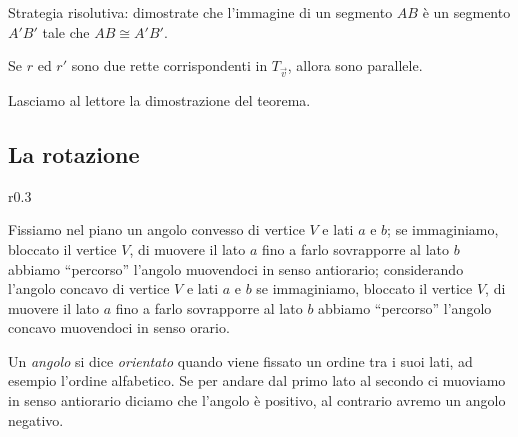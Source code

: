 Strategia risolutiva: dimostrate che l'immagine di un segmento \(AB\) è 
un segmento \(A'B'\) tale che \(AB\cong A'B'\).

\begin{teorema}
Se \(r\) ed \(r'\) sono due rette corrispondenti in \(T_{\vec{v}}\), allora 
sono parallele.
\end{teorema}

Lasciamo al lettore la dimostrazione del teorema.
\pagebreak

\subsection{La rotazione}

\setlength{\intextsep}{3pt plus 2.0pt minus 2.0pt}
\begin{wrapfigure}{r}{0.3\textwidth}
	\centering
\end{wrapfigure}
Fissiamo nel piano un angolo convesso di vertice \(V\) e lati \(a\) e 
\(b\); se immaginiamo, bloccato il vertice \(V\), di muovere il lato \(a\) 
fino a farlo sovrapporre al lato \(b\) abbiamo ``percorso'' l'angolo 
muovendoci in senso antiorario; considerando l'angolo concavo di 
vertice \(V\) e lati \(a\) e \(b\) se immaginiamo, bloccato il vertice \(V\), 
di muovere il lato \(a\) fino a farlo sovrapporre al lato \(b\) abbiamo 
``percorso'' l'angolo concavo muovendoci in senso orario.

\begin{definizione}
Un \emph{angolo} si dice \emph{orientato} quando viene fissato un 
ordine tra i suoi lati, ad esempio l'ordine alfabetico. Se per andare 
dal primo lato al secondo ci muoviamo in senso antiorario diciamo che 
l'angolo è positivo, al contrario avremo un angolo negativo.
\end{definizione}

